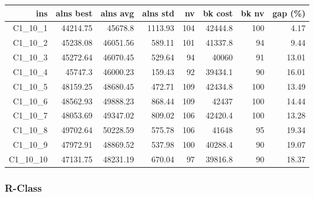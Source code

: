   \begin{table}[caption={Kết quả đo với tập HG\_C\_1\_10 1000 yêu cầu}, label=exp:HGC110]
    \centering
    \begin{tabular}{rrrrrrrr}
    \hline
    ins & alns best & alns avg & alns std & nv & bk cost & bk nv & gap (\%) \\ \hline
    C1\_10\_1 & 44214.75 & 45678.8 & 1113.93 & 104 & 42444.8 & 100 & 4.17 \\ \hline
    C1\_10\_2 & 45238.08 & 46051.56 & 589.11 & 101 & 41337.8 & 94 & 9.44 \\ \hline
    C1\_10\_3 & 45272.64 & 46070.45 & 529.64 & 94 & 40060 & 91 & 13.01 \\ \hline
    C1\_10\_4 & 45747.3 & 46000.23 & 159.43 & 92 & 39434.1 & 90 & 16.01 \\ \hline
    C1\_10\_5 & 48159.25 & 48680.45 & 472.71 & 109 & 42434.8 & 100 & 13.49 \\ \hline
    C1\_10\_6 & 48562.93 & 49888.23 & 868.44 & 109 & 42437 & 100 & 14.44 \\ \hline
    C1\_10\_7 & 48053.69 & 49347.02 & 809.02 & 106 & 42420.4 & 100 & 13.28 \\ \hline
    C1\_10\_8 & 49702.64 & 50228.59 & 575.78 & 106 & 41648 & 95 & 19.34 \\ \hline
    C1\_10\_9 & 47972.91 & 48869.52 & 537.98 & 100 & 40288.4 & 90 & 19.07 \\ \hline
    C1\_10\_10 & 47131.75 & 48231.19 & 670.04 & 97 & 39816.8 & 90 & 18.37 \\ \hline
    \end{tabular}
  \end{table}

  \subsubsection*{R-Class}

